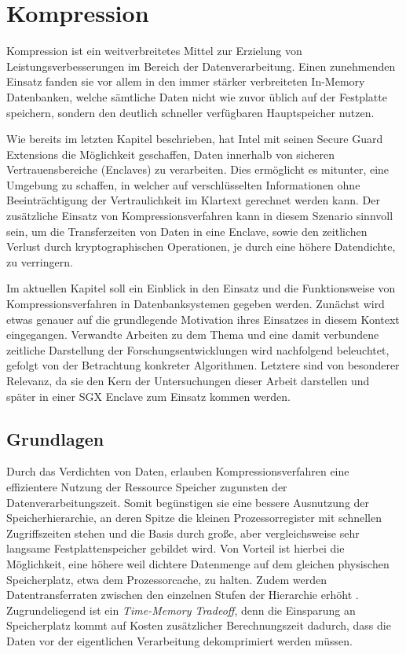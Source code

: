 
\chapter{Kompression}

Kompression ist ein weitverbreitetes Mittel zur Erzielung von Leistungsverbesserungen im Bereich der Datenverarbeitung. Einen zunehmenden Einsatz fanden sie vor allem in den immer stärker verbreiteten In-Memory Datenbanken, welche sämtliche Daten nicht wie zuvor üblich auf der Festplatte speichern, sondern den deutlich schneller verfügbaren Hauptspeicher nutzen.

Wie bereits im letzten Kapitel beschrieben, hat Intel mit seinen Secure Guard Extensions die Möglichkeit geschaffen, Daten innerhalb von sicheren Vertrauensbereiche (Enclaves) zu verarbeiten. Dies ermöglicht es mitunter, eine Umgebung zu schaffen, in welcher auf verschlüsselten Informationen ohne Beeinträchtigung der Vertraulichkeit im Klartext gerechnet werden kann. Der zusätzliche Einsatz von Kompressionsverfahren kann in diesem Szenario sinnvoll sein, um die Transferzeiten von Daten in eine Enclave, sowie den zeitlichen Verlust durch kryptographischen Operationen, je durch eine höhere Datendichte, zu verringern.

Im aktuellen Kapitel soll ein Einblick in den Einsatz und die Funktionsweise von Kompressionsverfahren in Datenbanksystemen gegeben werden. Zunächst wird etwas genauer auf die grundlegende Motivation ihres Einsatzes in diesem Kontext eingegangen. Verwandte Arbeiten zu dem Thema und eine damit verbundene zeitliche Darstellung der Forschungsentwicklungen wird nachfolgend beleuchtet, gefolgt von der Betrachtung konkreter Algorithmen. Letztere sind von besonderer Relevanz, da sie den Kern der Untersuchungen dieser Arbeit darstellen und später in einer SGX Enclave zum Einsatz kommen werden.

\section{Grundlagen}

Durch das Verdichten von Daten, erlauben Kompressionsverfahren eine effizientere Nutzung der Ressource Speicher zugunsten der Datenverarbeitungszeit. Somit begünstigen sie eine bessere Ausnutzung der Speicherhierarchie, an deren Spitze die kleinen Prozessorregister mit schnellen Zugriffszeiten stehen und die Basis durch große, aber vergleichsweise sehr langsame Festplattenspeicher gebildet wird. Von Vorteil ist hierbei die Möglichkeit, eine höhere weil dichtere Datenmenge auf dem gleichen physischen Speicherplatz, etwa dem Prozessorcache, zu halten. Zudem werden Datentransferraten zwischen den einzelnen Stufen der Hierarchie erhöht \cite{Croft2009}. Zugrundeliegend ist ein \textit{Time-Memory Tradeoff}, denn die Einsparung an Speicherplatz kommt auf Kosten zusätzlicher Berechnungszeit dadurch, dass die Daten vor der eigentlichen Verarbeitung dekomprimiert werden müssen.

